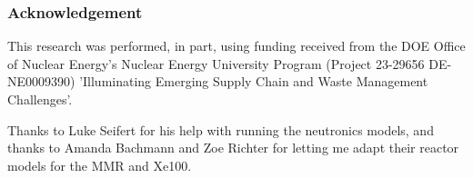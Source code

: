 \begin{frame}
  \frametitle{Acknowledgement}
    This research was performed, in part, using funding received from the DOE
    Office of Nuclear Energy's Nuclear Energy University Program (Project 23-29656
    DE-NE0009390) 'Illuminating Emerging Supply Chain and Waste Management
    Challenges'.

    Thanks to Luke Seifert for his help with running the neutronics models, and thanks to Amanda Bachmann and Zoe Richter for letting me adapt their reactor models for the MMR and Xe100.
\end{frame}
